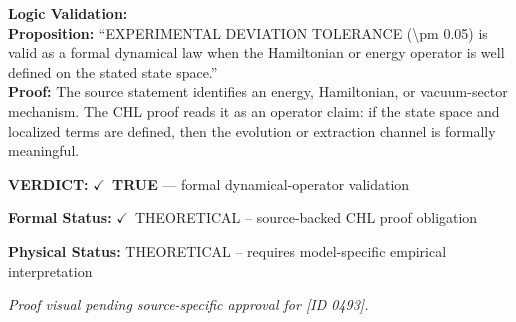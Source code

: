 \textbf{Logic Validation:}\\
\textbf{Proposition:} ``EXPERIMENTAL DEVIATION TOLERANCE (\textbackslash{}pm 0.05) is valid as a formal dynamical law when
the Hamiltonian or energy operator is well defined on the stated state space.''\\
\textbf{Proof:} The source statement identifies an energy, Hamiltonian, or vacuum-sector mechanism. The
CHL proof reads it as an operator claim: if the state space and localized terms are
defined, then the evolution or extraction channel is formally meaningful.

\textbf{VERDICT:} \ensuremath{\checkmark}\ \textbf{TRUE} --- formal dynamical-operator validation

\textbf{Formal Status:} \ensuremath{\checkmark}\ THEORETICAL -- source-backed CHL proof obligation

\textbf{Physical Status:} THEORETICAL -- requires model-specific empirical interpretation
\par\vspace{0.45em}
\par
\vfill
\begingroup\footnotesize\itshape
Proof visual pending source-specific approval for [ID 0493].
\par\endgroup
\vfill
\endgroup
\endgroup
